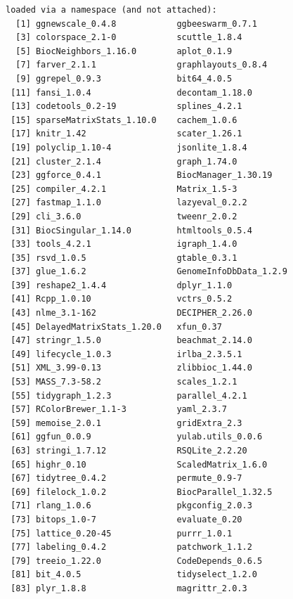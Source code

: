 \documentclass[
]{book}
\begin{document}
\begin{verbatim}
loaded via a namespace (and not attached):
  [1] ggnewscale_0.4.8            ggbeeswarm_0.7.1           
  [3] colorspace_2.1-0            scuttle_1.8.4              
  [5] BiocNeighbors_1.16.0        aplot_0.1.9                
  [7] farver_2.1.1                graphlayouts_0.8.4         
  [9] ggrepel_0.9.3               bit64_4.0.5                
 [11] fansi_1.0.4                 decontam_1.18.0            
 [13] codetools_0.2-19            splines_4.2.1              
 [15] sparseMatrixStats_1.10.0    cachem_1.0.6               
 [17] knitr_1.42                  scater_1.26.1              
 [19] polyclip_1.10-4             jsonlite_1.8.4             
 [21] cluster_2.1.4               graph_1.74.0               
 [23] ggforce_0.4.1               BiocManager_1.30.19        
 [25] compiler_4.2.1              Matrix_1.5-3               
 [27] fastmap_1.1.0               lazyeval_0.2.2             
 [29] cli_3.6.0                   tweenr_2.0.2               
 [31] BiocSingular_1.14.0         htmltools_0.5.4            
 [33] tools_4.2.1                 igraph_1.4.0               
 [35] rsvd_1.0.5                  gtable_0.3.1               
 [37] glue_1.6.2                  GenomeInfoDbData_1.2.9     
 [39] reshape2_1.4.4              dplyr_1.1.0                
 [41] Rcpp_1.0.10                 vctrs_0.5.2                
 [43] nlme_3.1-162                DECIPHER_2.26.0            
 [45] DelayedMatrixStats_1.20.0   xfun_0.37                  
 [47] stringr_1.5.0               beachmat_2.14.0            
 [49] lifecycle_1.0.3             irlba_2.3.5.1              
 [51] XML_3.99-0.13               zlibbioc_1.44.0            
 [53] MASS_7.3-58.2               scales_1.2.1               
 [55] tidygraph_1.2.3             parallel_4.2.1             
 [57] RColorBrewer_1.1-3          yaml_2.3.7                 
 [59] memoise_2.0.1               gridExtra_2.3              
 [61] ggfun_0.0.9                 yulab.utils_0.0.6          
 [63] stringi_1.7.12              RSQLite_2.2.20             
 [65] highr_0.10                  ScaledMatrix_1.6.0         
 [67] tidytree_0.4.2              permute_0.9-7              
 [69] filelock_1.0.2              BiocParallel_1.32.5        
 [71] rlang_1.0.6                 pkgconfig_2.0.3            
 [73] bitops_1.0-7                evaluate_0.20              
 [75] lattice_0.20-45             purrr_1.0.1                
 [77] labeling_0.4.2              patchwork_1.1.2            
 [79] treeio_1.22.0               CodeDepends_0.6.5          
 [81] bit_4.0.5                   tidyselect_1.2.0           
 [83] plyr_1.8.8                  magrittr_2.0.3             

\end{verbatim}
\end{document}
